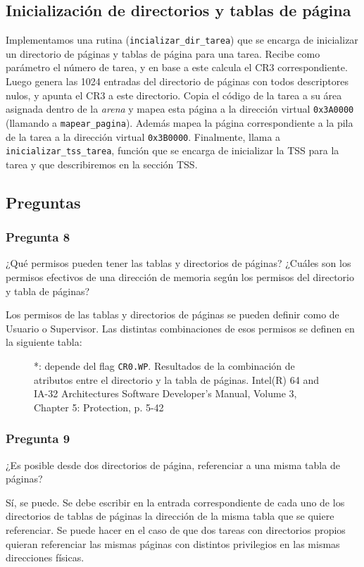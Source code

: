 \documentclass[10pt, a4paper]{article}
\begin{document}
\subsection{Inicialización de directorios y tablas de página}
Implementamos una rutina (\texttt{incializar\_dir\_tarea}) que se encarga de inicializar un directorio de páginas y tablas de página para una tarea. 
Recibe como parámetro el número de tarea, y en base a este calcula el CR3 correspondiente.
Luego genera las 1024 entradas del directorio de páginas con todos descriptores nulos, y apunta el CR3 a este directorio.
Copia
el código de la tarea a su área asignada dentro de la \emph{arena} y mapea esta página a la dirección virtual \texttt{0x3A0000} (llamando a \texttt{mapear\_pagina}). Además mapea la página correspondiente
a la pila de la tarea a la dirección virtual \texttt{0x3B0000}.
Finalmente, llama a \texttt{inicializar\_tss\_tarea}, función que se encarga de inicializar la TSS para la tarea y que describiremos en la sección TSS.
\subsection{Preguntas}
\subsubsection*{Pregunta 8}
 \begin{framed}
¿Qué permisos pueden tener las tablas y directorios de páginas? ¿Cuáles son los permisos efectivos de una dirección de memoria según los permisos del directorio
y tabla de páginas?
\end{framed}
Los permisos de las tablas y directorios de páginas se pueden definir como de Usuario o Supervisor. Las distintas combinaciones de esos permisos se definen en la siguiente tabla:

\begin{figure}[!h]
\begin{center}
\caption{*: depende del flag \texttt{CR0.WP}. Resultados de la combinación de atributos entre el directorio y la tabla de páginas. Intel(R) 64 and IA-32 Architectures Software Developer's Manual, Volume 3, Chapter 5: Protection, p. 5-42 }
\end{center}
\end{figure}
\subsubsection*{Pregunta 9}
 \begin{framed}
¿Es posible desde dos directorios de página, referenciar a una misma tabla de páginas? 
\end{framed}
Sí, se puede. Se debe escribir en la entrada correspondiente de cada uno de los directorios de tablas de páginas la dirección de la misma tabla que se quiere referenciar. Se puede hacer en el caso de que dos tareas
con directorios propios quieran referenciar las mismas páginas con distintos privilegios en las mismas direcciones físicas.
\end{document}
